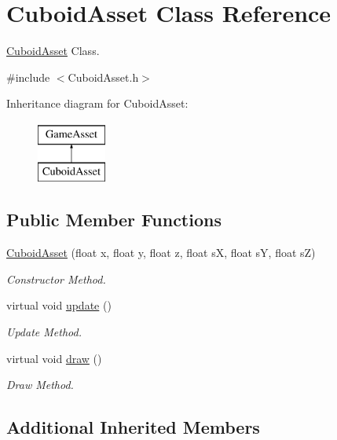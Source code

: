 \hypertarget{classCuboidAsset}{\section{Cuboid\-Asset Class Reference}
\label{classCuboidAsset}
}


\hyperlink{classCuboidAsset}{Cuboid\-Asset} Class.  




{\ttfamily \#include $<$Cuboid\-Asset.\-h$>$}

Inheritance diagram for Cuboid\-Asset\-:\begin{figure}[H]
\begin{center}
\leavevmode
\includegraphics[height=2.000000cm]{classCuboidAsset}
\end{center}
\end{figure}
\subsection*{Public Member Functions}
\begin{DoxyCompactItemize}
\item 
\hyperlink{classCuboidAsset_a05c45a76a82b779f130b0b5828d791c2}{Cuboid\-Asset} (float x, float y, float z, float s\-X, float s\-Y, float s\-Z)
\begin{DoxyCompactList}\small\item\em Constructor Method. \end{DoxyCompactList}\item 
virtual void \hyperlink{classCuboidAsset_a840b611da0e48bafef023ff98d97cf5b}{update} ()
\begin{DoxyCompactList}\small\item\em Update Method. \end{DoxyCompactList}\item 
virtual void \hyperlink{classCuboidAsset_adf627dc1cad3cfe5a039d829b4ad2c32}{draw} ()
\begin{DoxyCompactList}\small\item\em Draw Method. \end{DoxyCompactList}\end{DoxyCompactItemize}
\subsection*{Additional Inherited Members}


